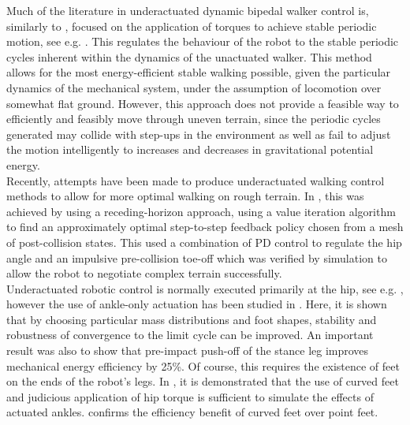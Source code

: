 Much of the literature in underactuated dynamic bipedal walker control is, similarly to \cite{tedrake2004actuating, collins2005bipedal}, focused on the application of torques to achieve stable periodic motion, see e.g. \cite{grizzle2001asymptotically, shiriaev2005constructive, sreenath2011compliant}. This regulates the behaviour of the robot to the stable periodic cycles inherent within the dynamics of the unactuated walker. This method allows for the most energy-efficient stable walking possible, given the particular dynamics of the mechanical system, under the assumption of locomotion over somewhat flat ground. However, this approach does not provide a feasible way to efficiently and feasibly move through uneven terrain, since the periodic cycles generated may collide with step-ups in the environment as well as fail to adjust the motion intelligently to increases and decreases in gravitational potential energy. \\

Recently, attempts have been made to produce underactuated walking control methods to allow for more optimal walking on rough terrain. In \cite{byl2008approximate}, this was achieved by using a receding-horizon approach, using a value iteration algorithm \cite{sutton1998introduction} to find an approximately optimal step-to-step feedback policy chosen from a mesh of post-collision states. This used a combination of PD control to regulate the hip angle and an impulsive pre-collision toe-off which was verified by simulation to allow the robot to negotiate complex terrain successfully. \\

Underactuated robotic control is normally executed primarily at the hip, see e.g. \cite{tedrake2004actuating, byl2008approximate, manchester2011stable}, however the use of ankle-only actuation has been studied in \cite{franken2008analysis}. Here, it is shown that by choosing particular mass distributions and foot shapes, stability and robustness of convergence to the limit cycle can be improved. An important result was also to show that pre-impact push-off of the stance leg improves mechanical energy efficiency by 25\%. Of course, this requires the existence of feet on the ends of the robot's legs. In \cite{asano2007dynamic}, it is demonstrated that the use of curved feet and judicious application of hip torque is sufficient to simulate the effects of actuated ankles. \cite{martin2014design} confirms the efficiency benefit of curved feet over point feet.\\

